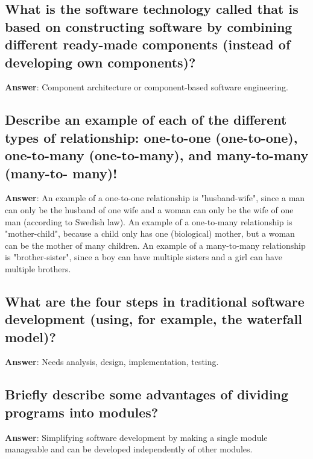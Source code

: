 \documentclass[a4paper,11pt,oneside]{article}
\begin{document}
\begin{sloppypar}
\subsection{What is the software technology called that is based on constructing software by combining different ready-made components (instead of developing own components)?}

\label{q:231:sa:en:True}

\textbf{Answer}: Component architecture or component-based software engineering.



\subsection{Describe an example of each of the different types of relationship: one-to-one (one-to-one), one-to-many (one-to-many), and many-to-many (many-to- many)!}

\label{q:232:sa:en:True}

\textbf{Answer}: An example of a one-to-one relationship is "husband-wife", since a man can only be the husband of one wife and a woman can only be the wife of one man (according to Swedish law). An example of a one-to-many relationship is "mother-child", because a child only has one (biological) mother, but a woman can be the mother of many children. An example of a many-to-many relationship is "brother-sister", since a boy can have multiple sisters and a girl can have multiple brothers.



\subsection{What are the four steps in traditional software development (using, for example, the waterfall model)?}

\label{q:233:sa:en:True}

\textbf{Answer}: Needs analysis, design, implementation, testing.



\subsection{Briefly describe some advantages of dividing programs into modules?}

\label{q:234:sa:en:True}

\textbf{Answer}: Simplifying software development by making a single module manageable and can be developed independently of other modules.




\end{sloppypar}
\end{document}
